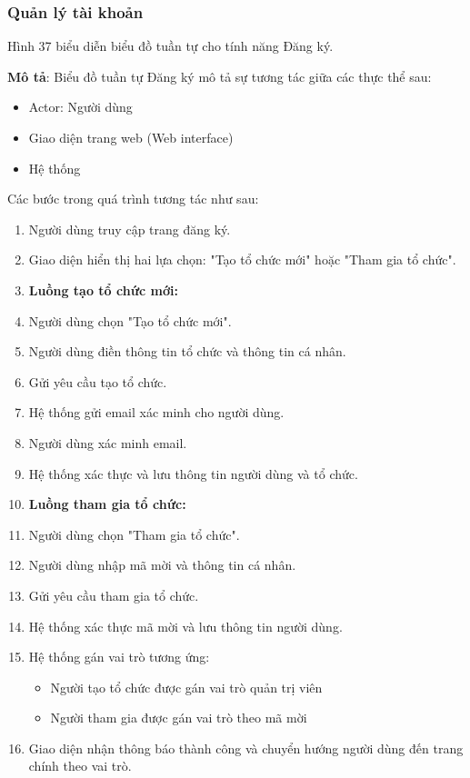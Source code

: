 \subsubsection{Quản lý tài khoản}
Hình 37 biểu diễn biểu đồ tuần tự cho tính năng Đăng ký.

\textbf{Mô tả}: Biểu đồ tuần tự Đăng ký mô tả sự tương tác giữa các thực thể sau:
\begin{itemize}
	\item Actor: Người dùng
	\item Giao diện trang web (Web interface)
	\item Hệ thống
\end{itemize}

Các bước trong quá trình tương tác như sau:
\begin{enumerate}
    \item Người dùng truy cập trang đăng ký.
    \item Giao diện hiển thị hai lựa chọn: "Tạo tổ chức mới" hoặc "Tham gia tổ chức".
    
    \item[3.] \textbf{Luồng tạo tổ chức mới:}
    \item[3a.] Người dùng chọn "Tạo tổ chức mới".
    \item[3b.] Người dùng điền thông tin tổ chức và thông tin cá nhân.
    \item[3c.] Gửi yêu cầu tạo tổ chức.
    \item[3d.] Hệ thống gửi email xác minh cho người dùng.
    \item[3e.] Người dùng xác minh email.
    \item[3f.] Hệ thống xác thực và lưu thông tin người dùng và tổ chức.
    
    \item[4.] \textbf{Luồng tham gia tổ chức:}
    \item[4a.] Người dùng chọn "Tham gia tổ chức".
    \item[4b.] Người dùng nhập mã mời và thông tin cá nhân.
    \item[4c.] Gửi yêu cầu tham gia tổ chức.
    \item[4d.] Hệ thống xác thực mã mời và lưu thông tin người dùng.
    
    \item[5.] Hệ thống gán vai trò tương ứng:
    \begin{itemize}
        \item Người tạo tổ chức được gán vai trò quản trị viên
        \item Người tham gia được gán vai trò theo mã mời
    \end{itemize}
    
    \item[6.] Giao diện nhận thông báo thành công và chuyển hướng người dùng đến trang chính theo vai trò.
\end{enumerate}

